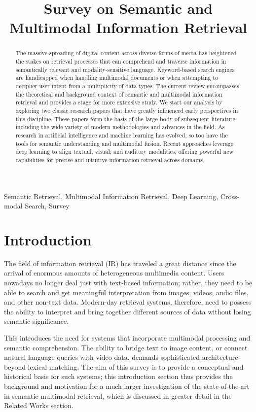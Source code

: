 \documentclass[conference]{IEEEtran}
\title{Survey on Semantic and Multimodal Information Retrieval}
\author{}
\begin{document}
\maketitle



\begin{abstract}
The massive spreading of digital content across diverse forms of media has heightened the stakes on retrieval processes that can comprehend and traverse information in semantically relevant and modality-sensitive language. Keyword-based search engines are handicapped when handling multimodal documents or when attempting to decipher user intent from a multiplicity of data types. The current review encompasses the theoretical and background context of semantic and multimodal information retrieval and provides a stage for more extensive study. We start our analysis by exploring two classic research papers that have greatly influenced early perspectives in this discipline. These papers form the basis of the large body of subsequent literature, including the wide variety of modern methodologies and advances in the field. As research in artificial intelligence and machine learning has evolved, so too have the tools for semantic understanding and multimodal fusion. Recent approaches leverage deep learning to align textual, visual, and auditory modalities, offering powerful new capabilities for precise and intuitive information retrieval across domains.
\end{abstract}

\begin{IEEEkeywords}
Semantic Retrieval, Multimodal Information Retrieval, Deep Learning, Cross-modal Search, Survey
\end{IEEEkeywords}

\section{Introduction}
The field of information retrieval (IR) has traveled a great distance since the arrival of enormous amounts of heterogeneous multimedia content. Users nowadays no longer deal just with text-based information; rather, they need to be able to search and get meaningful interpretation from images, videos, audio files, and other non-text data. Modern-day retrieval systems, therefore, need to possess the ability to interpret and bring together different sources of data without losing semantic significance.

This introduces the need for systems that incorporate multimodal processing and semantic comprehension. The ability to bridge text to image content, or connect natural language queries with video data, demands sophisticated architecture beyond lexical matching. The aim of this survey is to provide a conceptual and historical basis for such systems; this introduction section thus provides the background and motivation for a much larger investigation of the state-of-the-art in semantic multimodal retrieval, which is discussed in greater detail in the Related Works section.
\end{document}
